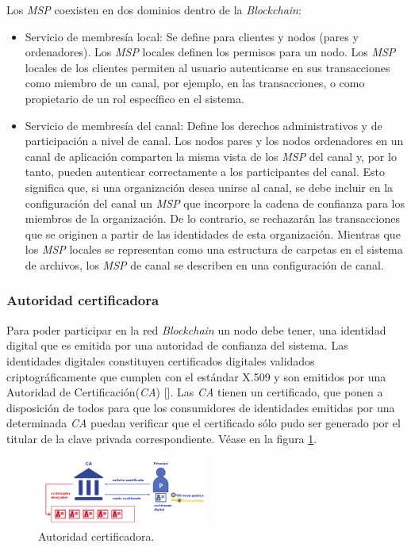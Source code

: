 Los \emph{MSP} coexisten en dos dominios dentro de la \emph{Blockchain}:
\begin{itemize}
\item Servicio de membres\'ia local: Se define para clientes y nodos (pares y ordenadores). Los \emph{MSP} locales definen los permisos para un nodo. Los \emph{MSP} locales de los clientes permiten al usuario autenticarse en sus transacciones como miembro de un canal, por ejemplo, en las transacciones, o como propietario de un rol espec\'ifico en el sistema.

\item Servicio de membres\'ia del canal: Define los derechos administrativos y de participaci\'on a nivel de canal. Los nodos pares y los nodos ordenadores en un canal de aplicaci\'on comparten la misma vista de los \emph{MSP} del canal y, por lo tanto, pueden autenticar correctamente a los participantes del canal. Esto significa que, si una organizaci\'on desea unirse al canal, se debe incluir en la configuraci\'on del canal un \emph{MSP} que incorpore la cadena de confianza para los miembros de la organizaci\'on. De lo contrario, se rechazar\'an las transacciones que se originen a partir de las identidades de esta organizaci\'on. Mientras que los \emph{MSP} locales se representan como una estructura de carpetas en el sistema de archivos, los \emph{MSP} de canal se describen en una configuraci\'on de canal.
\end{itemize}

\subsubsection{Autoridad certificadora}
Para poder participar en la red \emph{Blockchain} un nodo debe tener, una identidad digital que es emitida por una autoridad de confianza del sistema. Las identidades digitales constituyen certificados digitales validados criptogr\'aficamente que cumplen con el est\'andar X.509 y son emitidos por una Autoridad de Certificaci\'on(\emph{CA}) [\cite{CA}]. Las \emph{CA} tienen un certificado, que ponen a disposici\'on de todos para que los consumidores de identidades emitidas por una determinada \emph{CA} puedan verificar que el certificado s\'olo pudo ser generado por el titular de la clave privada correspondiente. V\'ease en la figura \ref{Autoridad certificadora}.

\begin{figure}[h]
\centering
\includegraphics[width=0.5\textwidth]{Graphics/CA.png}
\caption{Autoridad certificadora.}
\label{Autoridad certificadora}
\end{figure}

